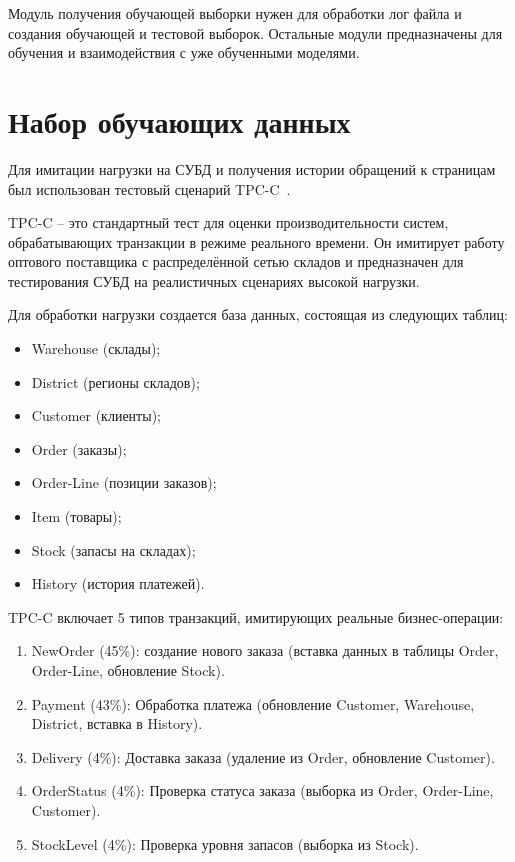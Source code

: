 Модуль получения обучающей выборки нужен для обработки лог файла и создания обучающей и тестовой выборок.
Остальные модули предназначены для обучения и взаимодействия с уже обученными моделями.

\section{Набор обучающих данных}
Для имитации нагрузки на СУБД и получения истории обращений к страницам был использован тестовый сценарий TPC-C~\cite{leutenegger1993modeling}.

TPC-C -- это стандартный тест для оценки производительности систем, обрабатывающих транзакции в режиме реального времени. 
Он имитирует работу оптового поставщика с распределённой сетью складов и предназначен для тестирования СУБД на реалистичных сценариях высокой нагрузки.

Для обработки нагрузки создается база данных, состоящая из следующих таблиц:
\begin{itemize}
	\item Warehouse (склады);
	\item District (регионы складов);
	\item Customer (клиенты);
	\item Order (заказы);
	\item Order-Line (позиции заказов);
	\item Item (товары);
	\item Stock (запасы на складах);
	\item History (история платежей).
\end{itemize}

TPC-C включает 5 типов транзакций, имитирующих реальные бизнес-операции:
\begin{enumerate}
	\item NewOrder (45\%): создание нового заказа (вставка данных в таблицы Order, Order-Line, обновление Stock).
	\item Payment (43\%): Обработка платежа (обновление Customer, Warehouse, District, вставка в History).
	\item Delivery (4\%): Доставка заказа (удаление из Order, обновление Customer).
	\item OrderStatus (4\%): Проверка статуса заказа (выборка из Order, Order-Line, Customer).
	\item StockLevel (4\%): Проверка уровня запасов (выборка из Stock).
\end{enumerate}

